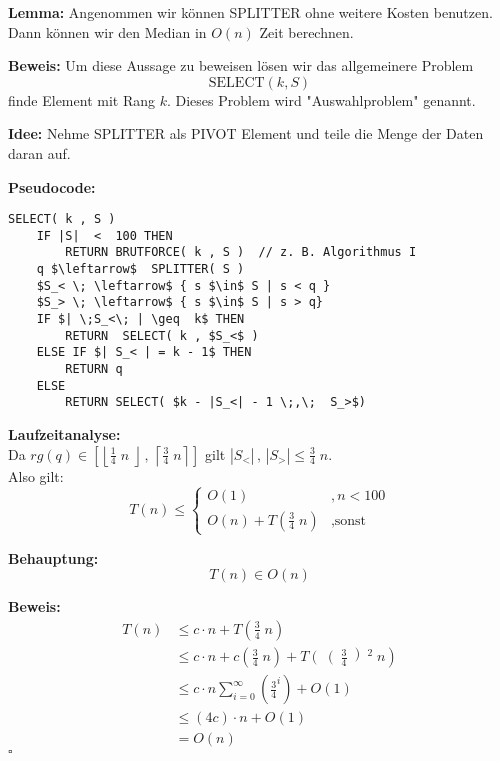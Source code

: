 \begin{description}

\item{\bfseries Lemma:} Angenommen wir können SPLITTER ohne weitere Kosten benutzen. Dann können wir den Median in $O (n)$ Zeit berechnen.

\item{\bfseries Beweis:} Um diese Aussage zu beweisen lösen wir das allgemeinere Problem 
$$\text{SELECT}(k,S)$$
finde Element mit Rang $k$.
\vspace{\baselineskip}
Dieses Problem wird "Auswahlproblem" genannt.

\item{\bfseries Idee:} Nehme SPLITTER als PIVOT Element und teile die Menge der Daten daran auf.

\pagebreak

\item{\bfseries Pseudocode:}


\begin{lstlisting}
SELECT( k , S )
	IF |S|  <  100 THEN
		RETURN BRUTFORCE( k , S )  // z. B. Algorithmus I
	q $\leftarrow$  SPLITTER( S )
	$S_< \; \leftarrow$ { s $\in$ S | s < q }
	$S_> \; \leftarrow$ { s $\in$ S | s > q}
	IF $| \;S_<\; | \geq  k$ THEN
		RETURN  SELECT( k , $S_<$ )
	ELSE IF $| S_< | = k - 1$ THEN
		RETURN q
	ELSE
		RETURN SELECT( $k - |S_<| - 1 \;,\;  S_>$)
\end{lstlisting}

\item{\bfseries Laufzeitanalyse:} \\ Da $rg(q) \in \left[\left\lfloor \frac{1}{4}\;n\;\right\rfloor\, , \, \left\lceil \frac{3}{4} \; n \right\rceil \right]$ gilt $\left| S_< \right| \, , \, \left| S_> \right| \leq \frac{3}{4} \; n$.\\
\vspace{\baselineskip}
Also gilt:
$$T(n) \leq \left\{ \begin{array}{lr} O(1) & , n < 100 \\ O(n) + T\left( \frac{3}{4} \; n\right) & ,\text{sonst} \end{array}\right. $$

\begin{description}

\item{\bfseries Behauptung:} $$T(n) \in O(n)$$

\item{\bfseries Beweis:}
$$
\begin{array}{rl}
T(n) & \leq c\cdot n + T\left( \frac{3}{4} \;n \right) \\
& \leq c \cdot n + c\left( \frac{3}{4} \;n \right) + T \left( \right(\frac{3}{4}\left)^2 \;n \right) \\
& \leq c\cdot n \sum_{i=0}^{\infty} \left( \frac{3}{4}^i \right) + O(1)\\
& \leq (4c)\cdot n + O(1)\\
&= O(n)
\end{array}
$$
\mbox{}\hfill $\square$
\end{description}


\end{description}
